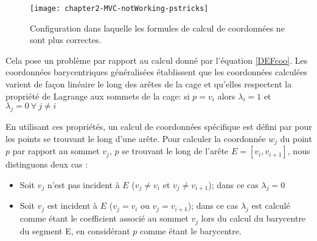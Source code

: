 \begin{figure}[ht]
  \begin{center}
    \texttt{[image: chapter2-MVC-notWorking-pstricks]}

    \caption[Cas particulier MVC] {Configuration dans laquelle les
formules de calcul de coordonnées ne sont plus correctes.}

    \label{DEFinc}
  \end{center}
\end{figure}

Cela pose un problème par rapport au calcul donné par l'équation \ref{DEFcoo}.
Les coordonnées barycentriques généralisées établissent que les coordonnées
calculées varient de façon linéaire le long des arêtes de la cage et qu'elles
respectent la propriété de Lagrange aux sommets de la cage: si $p = v_i$ alors
$\lambda_i = 1$ et $\lambda_j = 0 ~\forall~ j \neq i$

En utilisant ces propriétés, un calcul de coordonnées spécifique est défini
par \cite{HF06} pour les points se trouvant le long d'une arête. Pour calculer
la coordonnée $w_j$ du point $p$ par rapport au sommet $v_j$, $p$ se trouvant
le long de l'arête $E = [v_i,v_{i+1}]$, nous distinguons deux cas :

\begin{itemize}

\item Soit $v_j$ n'est pas incident à $E$ ($v_j \neq v_i$ et $v_j \neq
v_{i+1}$); dans ce cas $\lambda_j = 0$

\item Soit $v_j$ est incident à $E$ ($v_j = v_i$ ou $v_j = v_{i+1}$); dans ce
cas $\lambda_j$ est calculé comme étant le coefficient associé au sommet $v_j$
lors du calcul du barycentre du segment E, en considérant $p$ comme étant le
barycentre.

\end{itemize}